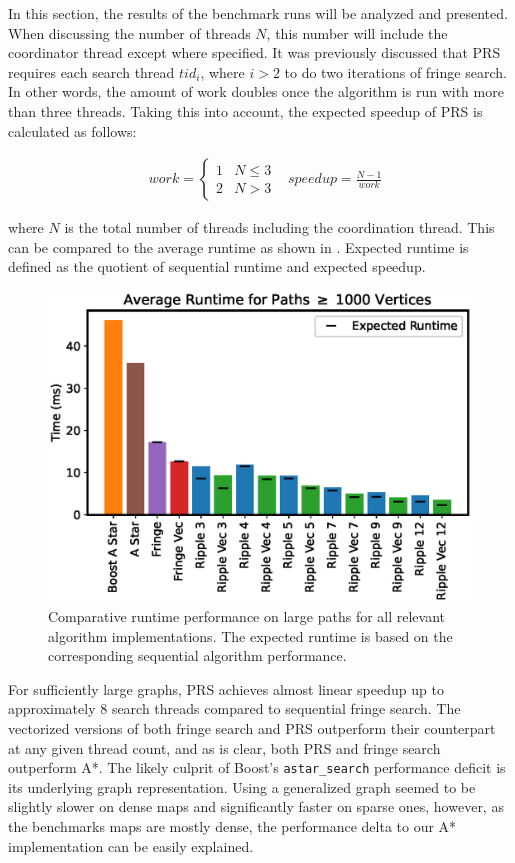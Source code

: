 In this section, the results of the benchmark runs will be analyzed and presented.
When discussing the number of threads $N$, this number will include the coordinator thread except where specified.
It was previously discussed that PRS requires each search thread $tid_i$, where $i > 2$ to do two iterations of fringe search. 
In other words, the amount of work doubles once the algorithm is run with more than three threads. 
Taking this into account, the expected speedup of PRS is calculated as follows:

\begin{align*}
    & work = 
    \begin{cases} 
        1 & N \leq 3 \\
        2 & N > 3
    \end{cases} 
    & speedup = \frac{N-1}{work}
\end{align*}

\noindent where $N$ is the total number of threads including the coordination thread. This can be compared to the average runtime as shown in . Expected runtime is defined as the quotient of sequential runtime and expected speedup.

\begin{figure}[H]
    \centering
    \includegraphics[width=\linewidth]{img/runtime.eps}
    \caption{Comparative runtime performance on large paths for all relevant algorithm implementations. The expected runtime is based on the corresponding sequential algorithm performance.}
    \label{fig:runtime}
\end{figure}

\noindent For sufficiently large graphs, PRS achieves almost linear speedup up to approximately 8 search threads compared to sequential fringe search. 
The vectorized versions of both fringe search and PRS outperform their counterpart at any given thread count, and as is clear, both PRS and fringe search outperform A*. 
The likely culprit of Boost's \linebreak\lstinline{astar_search} performance deficit is its underlying graph representation. Using a generalized graph seemed to be slightly slower on dense maps and significantly faster on sparse ones, however, as the benchmarks maps are mostly dense, the performance delta to our A* implementation can be easily explained.

